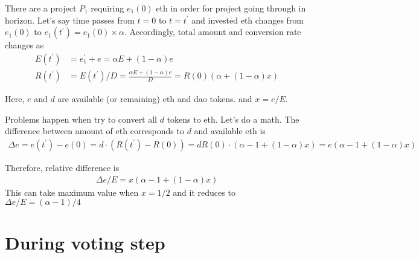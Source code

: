 \documentclass{jarticle}
\begin{document}
There are a project $P_1$ requiring $e_1(0)$ eth in order for project going through in horizon.
Let's say time passes from $t=0$ to $t=t^\prime$ and invested eth changes from $e_1(0)$ to $e_1(t^\prime) = e_1(0) \times \alpha$. Accordingly, total amount and conversion rate changes as 
\begin{align*}
    E(t^\prime) &= e_1^\prime + e = \alpha E + (1-\alpha)e\\
    R(t^\prime) &= E(t^\prime)/D = \frac{\alpha E + (1-\alpha)e}{D} = R(0)(\alpha + (1-\alpha)x)
\end{align*}

Here, $e$ and $d$ are available (or remaining) eth and dao tokens. and $x = e/E$. 

Problems happen when try to convert all $d$ tokens to eth. Let's do a math.
The difference between amount of eth corresponds to $d$ and available eth is 
\begin{align*}
    \Delta e = e(t^\prime) - e(0) = d \cdot ( R(t^\prime)  - R(0) )= dR(0)\cdot (\alpha - 1 + (1-\alpha)x) = e(\alpha - 1 + (1-\alpha)x) 
\end{align*}

Therefore, relative difference is 
\begin{align*}
    \Delta e / E =  x(\alpha - 1 + (1-\alpha)x) 
\end{align*}
This can take maximum value when $x = 1/2$ and it reduces to $\Delta e / E = (\alpha - 1)/4$ 


\section{During voting step}





\end{document}
